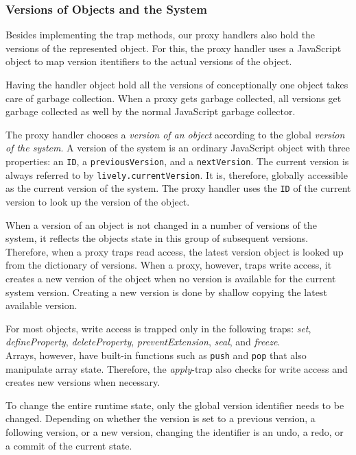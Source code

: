 \subsubsection{Versions of Objects and the System}

Besides implementing the trap methods, our proxy handlers also hold the versions of the represented object.
For this, the proxy handler uses a JavaScript object to map version itentifiers to the actual versions of the object.

Having the handler object hold all the versions of conceptionally one object takes care of garbage collection.
When a proxy gets garbage collected, all versions get garbage collected as well by the normal JavaScript garbage collector.

The proxy handler chooses a \emph{version of an object} according to the global \emph{version of the system}.
A version of the system is an ordinary JavaScript object with three properties: an \lstinline{ID}, a \lstinline{previousVersion}, and a \lstinline{nextVersion}.
The current version is always referred to by \lstinline{lively.currentVersion}.
It is, therefore, globally accessible as the current version of the system.
The proxy handler uses the \lstinline{ID} of the current version to look up the version of the object.

When a version of an object is not changed in a number of versions of the system, it reflects the objects state in this group of subsequent versions.
Therefore, when a proxy traps read access, the latest version object is looked up from the dictionary of versions.
When a proxy, however, traps write access, it creates a new version of the object when no version is available for the current system version.
Creating a new version is done by shallow copying the latest available version.

For most objects, write access is trapped only in the following traps: \emph{set}, \emph{defineProperty}, \emph{deleteProperty}, \emph{preventExtension}, \emph{seal}, and \emph{freeze}.\\
Arrays, however, have built-in functions such as \lstinline{push} and \lstinline{pop} that also manipulate array state.
Therefore, the \emph{apply}-trap also checks for write access and creates new versions when necessary.

To change the entire runtime state, only the global version identifier needs to be changed.
Depending on whether the version is set to a previous version, a following version, or a new version, changing the identifier is an undo, a redo, or a commit of the current state.

